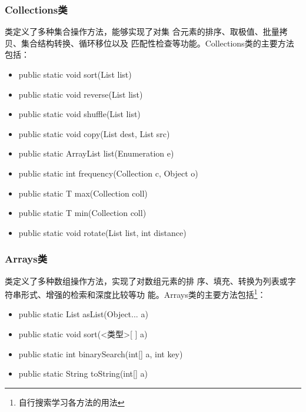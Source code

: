 \begin{frame}[fragile] %
  \frametitle{Collections类}

   类定义了多种集合操作方法，能够实现了对集
  合元素的{\Blue\hei 排序、取极值、批量拷贝、集合结构转换、循环移位以及
    匹配性检查}等功能。Collections类的主要方法包括：

  \begin{itemize}\small
  \item public static void sort(List list)
  \item public static void reverse(List list)
  \item public static void shuffle(List list)
  \item public static void copy(List dest, List src)
  \item public static ArrayList list(Enumeration e)
  \item public static int frequency(Collection c, Object o)
  \item public static T max(Collection coll)
  \item public static T min(Collection coll)
  \item public static void rotate(List list, int distance)
  \end{itemize}
\end{frame}

\begin{frame}[fragile] %
  \frametitle{Arrays类}

   类定义了多种数组操作方法，实现了对数组元素的排
  序、填充、转换为列表或字符串形式、增强的检索和深度比较等功
  能。Arrays类的主要方法包括\footnote{自行搜索学习各方法的用法}：

  \begin{itemize}
  \item public static List asList(Object... a)
  \item public static void sort(<类型>[ ] a)
  \item public static int binarySearch(int[] a, int key)
  \item public static String toString(int[] a)
  \end{itemize}
\end{frame}


